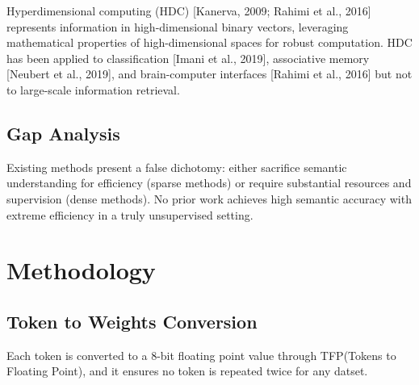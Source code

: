 \documentclass[scifiniti,article,submit,moreauthors,twocolumn,twoside]{Definitions/scifiniti_jams}
\begin{document}
Hyperdimensional computing (HDC) [Kanerva, 2009; Rahimi et al., 2016] represents information in high-dimensional binary vectors, leveraging mathematical properties of high-dimensional spaces for robust computation. HDC has been applied to classification [Imani et al., 2019], associative memory [Neubert et al., 2019], and brain-computer interfaces [Rahimi et al., 2016] but not to large-scale information retrieval.

\subsection{Gap Analysis}

Existing methods present a false dichotomy: either sacrifice semantic understanding for efficiency (sparse methods) or require substantial resources and supervision (dense methods). No prior work achieves high semantic accuracy with extreme efficiency in a truly unsupervised setting.


\section{Methodology}

\subsection{Token to Weights Conversion} 
Each token is converted to a 8-bit floating point value through TFP(Tokens to Floating Point), and it ensures no token is repeated twice for any datset.

\vspace{0.50cm}

\usetikzlibrary{arrows.meta, positioning, shadows}
\end{document}
